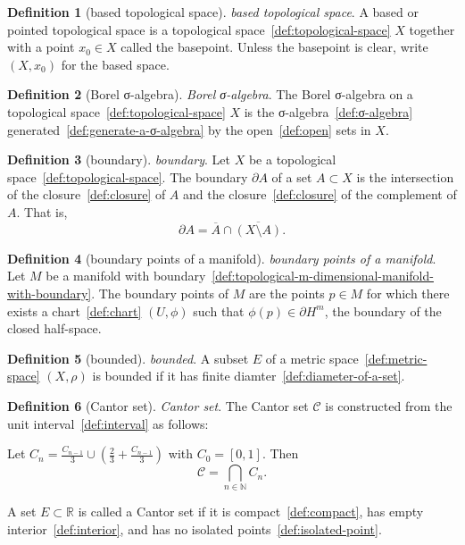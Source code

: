 \documentclass[12pt,a4paper]{article}
\theoremstyle{definition}
\newtheorem{definition}{Definition}
\begin{document}
\begin{definition}[based topological space]\label{def:based-topological-space}
\emph{based topological space}. A based or pointed topological space is a topological space~\ref{def:topological-space} $X$ together with a point $x_0\in X$ called the basepoint. Unless the basepoint is clear, write $(X, x_0)$ for the based space.
\end{definition}

\begin{definition}[Borel σ-algebra]\label{def:borel-σ-algebra}
\emph{Borel σ-algebra}. The Borel σ-algebra on a topological space~\ref{def:topological-space} $X$ is the σ-algebra~\ref{def:σ-algebra} generated~\ref{def:generate-a-σ-algebra} by the open~\ref{def:open} sets in $X$.
\end{definition}

\begin{definition}[boundary]\label{def:boundary}
\emph{boundary}. Let $X$ be a topological space~\ref{def:topological-space}. The boundary $\partial A$ of a set $A \subset X$ is the intersection of the closure~\ref{def:closure} of $A$ and the closure~\ref{def:closure} of the complement of $A$. That is, $$\partial A = \overline A \cap \overline{(X\setminus A)}.$$
\end{definition}

\begin{definition}[boundary points of a manifold]\label{def:boundary-points-of-a-manifold}
\emph{boundary points of a manifold}. Let $M$ be a manifold with boundary~\ref{def:topological-m-dimensional-manifold-with-boundary}. The boundary points of $M$ are the points $p\in M$ for which there exists a chart~\ref{def:chart} $(U,\phi)$ such that $\phi(p) \in \partial H^m$, the boundary of the closed half-space.
\end{definition}

\begin{definition}[bounded]\label{def:bounded}
\emph{bounded}. A subset $E$ of a metric space~\ref{def:metric-space} $(X,\rho)$ is bounded if it has finite diamter~\ref{def:diameter-of-a-set}.
\end{definition}

\begin{definition}[Cantor set]\label{def:cantor-set}
\emph{Cantor set}. The Cantor set $\mathcal C$ is constructed from the unit interval~\ref{def:interval} as follows:

Let $C_n = \frac{C_{n-1}}{3} \cup \left(\frac{2}{3} +\frac{C_{n-1}}{3}\right)$ with $C_0 = [0,1]$. Then $$\mathcal C = \bigcap_{n\in\mathbb N} C_n.$$

A set $E\subset \mathbb R$ is called a Cantor set if it is compact~\ref{def:compact}, has empty interior~\ref{def:interior}, and has no isolated points~\ref{def:isolated-point}.
\end{definition}
\end{document}
